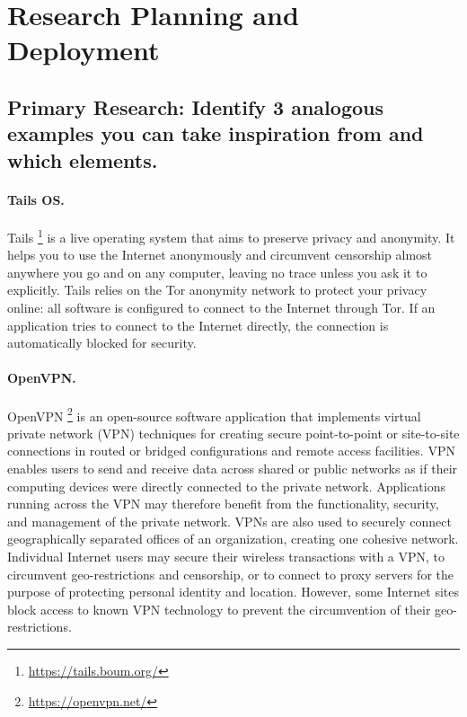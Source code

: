 \vspace{1cm}
\section{Research Planning and Deployment}
\label{sec_b}

\vspace{1cm}
\subsection{Primary Research: Identify 3 analogous examples you can take 
inspiration from and which elements.}
\vspace{0.7cm}

\paragraph{Tails OS.\\}

Tails \footnote{\url{https://tails.boum.org/}} is a live  operating system that 
aims to preserve privacy and anonymity. 
It helps you to use the Internet anonymously and circumvent censorship almost 
anywhere you go and on any computer, leaving no trace unless you ask it to 
explicitly. Tails relies on the Tor anonymity network to protect your privacy 
online: all software is configured to connect to the Internet through Tor.
If an application tries to connect to the Internet directly, the connection is 
automatically blocked for security.

\paragraph{OpenVPN.\\}

OpenVPN \footnote{\url{https://openvpn.net/}} is an open-source software 
application that implements virtual private 
network (VPN) techniques for creating secure point-to-point or site-to-site 
connections in routed or bridged configurations and remote access facilities.
VPN enables users to send and receive data across shared or public networks as 
if their computing devices were directly connected to the private network. 
Applications running across the VPN may therefore benefit from the functionality, 
security, and management of the private network.
VPNs are  also used to securely connect geographically separated offices of an 
organization, creating one cohesive network. Individual Internet users may 
secure their  wireless transactions with a VPN, to circumvent geo-restrictions 
and censorship, or to connect to proxy servers for the purpose of protecting 
personal identity and location. However, some Internet sites block access to 
known VPN technology to prevent the circumvention of their geo-restrictions.


